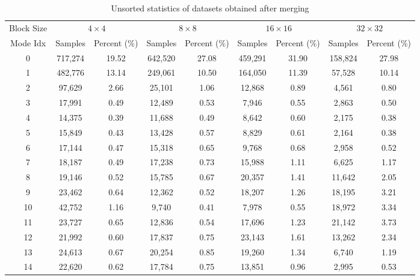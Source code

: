 
\begin{table}[H]
    \caption{Unsorted statistics of datasets obtained after merging}
    \bigskip\label{tab:unsorted-distribution-after-first-step}
    \centering
    \resizebox{\textwidth}{!}
    {\begin{tabular}{c c c c c c c c c}
        \toprule
        Block Size & \multicolumn{2}{c}{\(4\times4\)} & \multicolumn{2}{c}{\(8\times8\)} & \multicolumn{2}{c}{\(16\times16\)} & \multicolumn{2}{c}{\(32\times32\)} \\
        Mode Idx & Samples & Percent (\%) & Samples & Percent (\%) & Samples & Percent (\%) & Samples & Percent (\%)\\
        \midrule
        0 & 717,274 & 19.52 & 642,520 & 27.08 & 459,291 & 31.90 & 158,824 & 27.98 \\ 
        1 & 482,776 & 13.14 & 249,061 & 10.50 & 164,050 & 11.39 & 57,528 & 10.14 \\ 
        2 & 97,629 &  2.66 & 25,101 &  1.06 & 12,868 &  0.89 & 4,561 &  0.80 \\ 
        3 & 17,991 &  0.49 & 12,489 &  0.53 & 7,946 &  0.55 & 2,863 &  0.50 \\ 
        4 & 14,375 &  0.39 & 11,688 &  0.49 & 8,642 &  0.60 & 2,175 &  0.38 \\ 
        5 & 15,849 &  0.43 & 13,428 &  0.57 & 8,829 &  0.61 & 2,164 &  0.38 \\ 
        6 & 17,144 &  0.47 & 15,318 &  0.65 & 9,768 &  0.68 & 2,958 &  0.52 \\ 
        7 & 18,187 &  0.49 & 17,238 &  0.73 & 15,988 &  1.11 & 6,625 &  1.17 \\ 
        8 & 19,146 &  0.52 & 15,785 &  0.67 & 20,357 &  1.41 & 11,642 &  2.05 \\ 
        9 & 23,462 &  0.64 & 12,362 &  0.52 & 18,207 &  1.26 & 18,195 &  3.21 \\ 
       10 & 42,752 &  1.16 & 9,740 &  0.41 & 7,978 &  0.55 & 18,972 &  3.34 \\ 
       11 & 23,727 &  0.65 & 12,836 &  0.54 & 17,696 &  1.23 & 21,142 &  3.73 \\ 
       12 & 21,992 &  0.60 & 17,837 &  0.75 & 23,143 &  1.61 & 13,262 &  2.34 \\ 
       13 & 24,613 &  0.67 & 20,254 &  0.85 & 19,260 &  1.34 & 6,740 &  1.19 \\ 
       14 & 22,620 &  0.62 & 17,784 &  0.75 & 13,851 &  0.96 & 2,995 &  0.53 \\ 

\end{tabular}}
\end{table}
